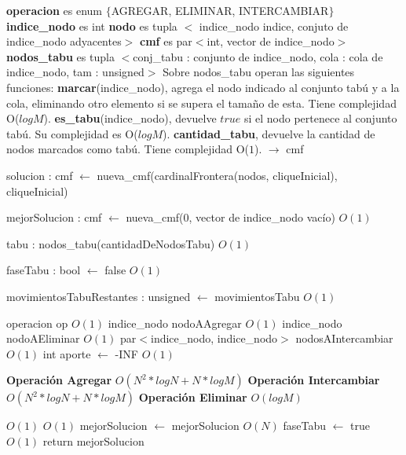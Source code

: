 \documentclass[a4paper, 10pt, twoside]{article}
\newenvironment{pseudo}[1][]{%
    \vspace{1em}%
    \begin{algorithmic}%
}
{%
    \end{algorithmic}%
    \vspace{1em}%
}
\newcommand{\Ode}[1]{\hfill $O(#1)$}
\begin{document}
\begin{pseudo}

\State \textbf{operacion} es enum $\lbrace$AGREGAR, ELIMINAR, INTERCAMBIAR$\rbrace$
\State \textbf{indice\_nodo} es int
\State \textbf{nodo} es tupla $<$ indice\_nodo indice, conjuto de indice\_nodo adyacentes$>$
\State \textbf{cmf} es par$<$int, vector de indice\_nodo$>$
\State \textbf{nodos\_tabu} es  tupla $<$conj\_tabu : conjunto de indice\_nodo, cola : cola de indice\_nodo, tam : unsigned$>$
\State
\State Sobre nodos\_tabu operan las siguientes funciones:
\State \textbf{marcar}(indice\_nodo), agrega el nodo indicado al conjunto tabú y a la cola, eliminando otro elemento si se supera
el tamaño de esta. Tiene complejidad O($log M$).
\State \textbf{es\_tabu}(indice\_nodo), devuelve $true$ si el nodo pertenece al conjunto tabú. Su complejidad es O($log M$).
\State \textbf{cantidad\_tabu}, devuelve la cantidad de nodos marcados como tabú. Tiene complejidad O($1$).
\State
{} $\rightarrow$ cmf
	
	\State solucion : cmf $\leftarrow$ nueva\_cmf(cardinalFrontera(nodos, cliqueInicial), cliqueInicial)

	\State mejorSolucion : cmf $\leftarrow$ nueva\_cmf(0, vector de indice\_nodo vacío) 				\Ode{1}

	\State tabu : nodos\_tabu(cantidadDeNodosTabu) 													\Ode{1}

	\State faseTabu : bool $\leftarrow$ false 														\Ode{1}

	\State movimientosTabuRestantes : unsigned $\leftarrow$ movimientosTabu 						\Ode{1}


		\State operacion op 																		\Ode{1}
		\State indice\_nodo nodoAAgregar															\Ode{1}
		\State indice\_nodo nodoAEliminar															\Ode{1}
		\State par$<$indice\_nodo, indice\_nodo$>$ nodosAIntercambiar								\Ode{1}
		\State int aporte $\leftarrow$ -INF															\Ode{1}

		\State
		\State \textbf{Operación Agregar}															\Ode{N^2 * log N + N * log M}
		\State
		\State \textbf{Operación Intercambiar}														\Ode{N^2 * log N + N * log M}
		\State
		\State \textbf{Operación Eliminar}															\Ode{log M}
		\State

																					\Ode{1}
																						\Ode{1}
					\State mejorSolucion $\leftarrow$ mejorSolucion 								\Ode{N}
					\State faseTabu $\leftarrow$ true 												\Ode{1}
				\EndIf
				\State
				 return mejorSolucion \EndIf


\end{pseudo}
\end{document}
